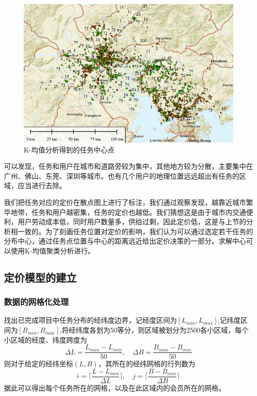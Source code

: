 \documentclass[withoutpreface,bwprint]{cumcmthesis} %
\begin{document}
\begin{figure}[H]
    \centering
    \includegraphics[width=15cm]{1.png}
    \caption{K-均值分析得到的任务中心点}
    \label{图}
\end{figure}
可以发现，任务和用户在城市和道路旁较为集中，其他地方较为分散，主要集中在广州、佛山、东莞、深圳等城市。也有几个用户的地理位置远远超出有任务的区域，应当进行去除。

我们把任务对应的定价在散点图上进行了标注，我们通过观察发现，越靠近城市繁华地带，任务和用户越密集，任务的定价也越低。我们猜想这是由于城市内交通便利，用户劳动成本低，同时用户数量多，供给过剩，因此定价低，这是与上节的分析相一致的。为了刻画任务位置对定价的影响，我们认为可以通过选定若干任务的分布中心，通过任务点位置与中心的距离远近给出定价决策的一部分。求解中心可以使用K-均值聚类分析进行。

\subsection{定价模型的建立}

\subsubsection{数据的网格化处理}
找出已完成项目中任务分布的经纬度边界，记经度区间为$[L_{min},L_{max}]$,记纬度区间为$[B_{min},B_{max}]$,将经纬度各划为50等分，则区域被划分为2500各小区域，每个小区域的经度、纬度跨度为$$\Delta L=\frac{L_{max}-L_{min}}{50},\quad \Delta B=\frac{B_{max}-B_{min}}{50}$$则对于给定的经纬坐标$(L,B)$，其所在的经纬网格的行列数为$$i=\lceil \frac{L-L_{min}}{\Delta L}\rceil,\quad j=\lceil \frac{B-B_{min}}{\Delta B}\rceil$$据此可以得出每个任务所在的网格，以及在此区域内的会员所在的网格。
\end{document}
